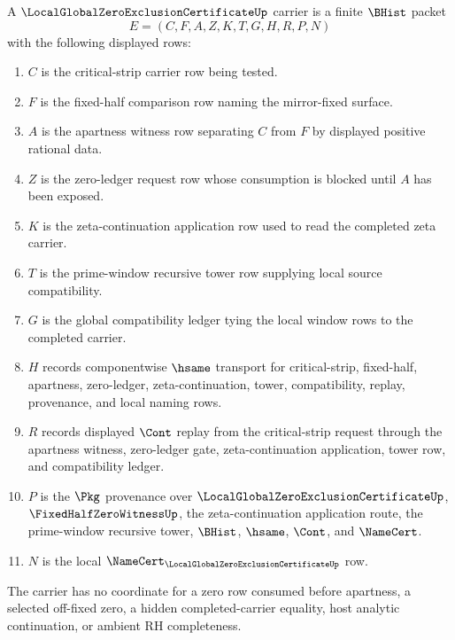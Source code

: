\begin{definition}
\label{def:local-global-zero-exclusion-certificate-carrier}
A $\LocalGlobalZeroExclusionCertificateUp$ carrier is a finite $\BHist$ packet
$$
E=(C,F,A,Z,K,T,G,H,R,P,N)
$$
with the following displayed rows:
\begin{enumerate}
\item $C$ is the critical-strip carrier row being tested.
\item $F$ is the fixed-half comparison row naming the mirror-fixed surface.
\item $A$ is the apartness witness row separating $C$ from $F$ by displayed positive rational data.
\item $Z$ is the zero-ledger request row whose consumption is blocked until $A$ has been exposed.
\item $K$ is the zeta-continuation application row used to read the completed zeta carrier.
\item $T$ is the prime-window recursive tower row supplying local source compatibility.
\item $G$ is the global compatibility ledger tying the local window rows to the completed carrier.
\item $H$ records componentwise $\hsame$ transport for critical-strip, fixed-half, apartness, zero-ledger, zeta-continuation, tower, compatibility, replay, provenance, and local naming rows.
\item $R$ records displayed $\Cont$ replay from the critical-strip request through the apartness witness, zero-ledger gate, zeta-continuation application, tower row, and compatibility ledger.
\item $P$ is the $\Pkg$ provenance over $\LocalGlobalZeroExclusionCertificateUp$, $\FixedHalfZeroWitnessUp$, the zeta-continuation application route, the prime-window recursive tower, $\BHist$, $\hsame$, $\Cont$, and $\NameCert$.
\item $N$ is the local $\NameCert_{\LocalGlobalZeroExclusionCertificateUp}$ row.
\end{enumerate}
The carrier has no coordinate for a zero row consumed before apartness, a selected off-fixed zero, a hidden completed-carrier equality, host analytic continuation, or ambient RH completeness.
\end{definition}

